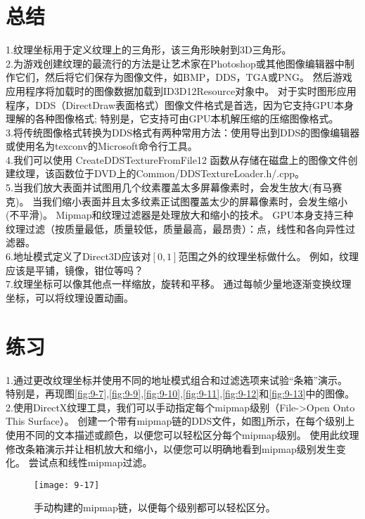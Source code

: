\section{总结}
\begin{flushleft}
1.纹理坐标用于定义纹理上的三角形，该三角形映射到3D三角形。\\
2.为游戏创建纹理的最流行的方法是让艺术家在Photoshop或其他图像编辑器中制作它们，然后将它们保存为图像文件，如BMP，DDS，TGA或PNG。 然后游戏应用程序将加载时的图像数据加载到ID3D12Resource对象中。 对于实时图形应用程序，DDS（DirectDraw表面格式）图像文件格式是首选，因为它支持GPU本身理解的各种图像格式; 特别是，它支持可由GPU本机解压缩的压缩图像格式。\\
3.将传统图像格式转换为DDS格式有两种常用方法：使用导出到DDS的图像编辑器或使用名为texconv的Microsoft命令行工具。\\
4.我们可以使用 CreateDDSTextureFromFile12 函数从存储在磁盘上的图像文件创建纹理，该函数位于DVD上的Common/DDSTextureLoader.h/.cpp。\\
5.当我们放大表面并试图用几个纹素覆盖太多屏幕像素时，会发生放大(有马赛克)。 当我们缩小表面并且太多纹素正试图覆盖太少的屏幕像素时，会发生缩小(不平滑)。 Mipmap和纹理过滤器是处理放大和缩小的技术。 GPU本身支持三种纹理过滤（按质量最低，质量较低，质量最高，最昂贵）：点，线性和各向异性过滤器。\\
6.地址模式定义了Direct3D应该对$[0,1]$范围之外的纹理坐标做什么。 例如，纹理应该是平铺，镜像，钳位等吗？\\
7.纹理坐标可以像其他点一样缩放，旋转和平移。 通过每帧少量地逐渐变换纹理坐标，可以将纹理设置动画。
\end{flushleft}

\section{练习}
\begin{flushleft}
1.通过更改纹理坐标并使用不同的地址模式组合和过滤选项来试验“条箱”演示。 特别是，再现图\ref{fig:9-7},\ref{fig:9-9},\ref{fig:9-10},\ref{fig:9-11},\ref{fig:9-12}和\ref{fig:9-13}中的图像。\\
2.使用DirectX纹理工具，我们可以手动指定每个mipmap级别（File->Open Onto This Surface）。 创建一个带有mipmap链的DDS文件，如图\ref{fig:9-17}所示，在每个级别上使用不同的文本描述或颜色，以便您可以轻松区分每个mipmap级别。 使用此纹理修改条箱演示并让相机放大和缩小，以便您可以明确地看到mipmap级别发生变化。 尝试点和线性mipmap过滤。\\
\end{flushleft}
\begin{figure}[h]
    \label{fig:9-17}
    \texttt{[image: 9-17]}
    \centering
    \caption{手动构建的mipmap链，以便每个级别都可以轻松区分。}
\end{figure}

